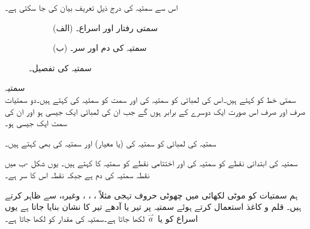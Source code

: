 اس سے سمتیہ کی درج ذیل تعریف بیان کی جا سکتی ہے۔
\begin{figure}
\centering
\begin{subfigure}{0.5\textwidth}
\centering
{}
\caption*{(الف) سمتی رفتار اور اسراع۔}
\end{subfigure}%
\begin{subfigure}{0.5\textwidth}
\centering
{}
\caption*{(ب) سمتیہ کی دم اور  سر۔}
\end{subfigure}%
\caption{سمتیہ کی تفصیل۔}
\label{شکل_الجبرا_قوت_سمتی_رفتار}
\end{figure}
\quad سمتیہ\\
سمتی خط کو  کہتے ہیں۔اس کی لمبائی کو سمتیہ کی  اور سمت کو سمتیہ کی  کہتے ہیں۔دو سمتیات صرف اور صرف اس صورت ایک دوسرے کے برابر ہوں گے جب ان کی لمبائی ایک جیسی ہو اور ان کی سمت ایک جیسی ہو۔

سمتیہ کی لمبائی کو سمتیہ کی  (یا معیار) اور سمتیہ کی  بھی کہتے ہیں۔

سمتیہ کی ابتدائی نقطے کو سمتیہ کی  اور اختتامی نقطے کو سمتیہ کا  کہتے ہیں۔ یوں شکل -ب میں نقطہ  سمتیہ  کی دم  ہے جبکہ نقطہ  اس کا سر  ہے۔

ہم سمتیات کو موٹی لکھائی میں چھوٹی حروف تہجی مثلاً ، ، ، وغیرہ،  سے ظاہر کرتے ہیں۔ قلم و کاغذ استعمال کرتے ہوئے سمتیہ پر تیر  یا آدھے تیر کا نشان بنایا جاتا ہے یوں اسراع کو  یا  
$\overset{\rightharpoonup}{\rule{0pt}{.9ex}\smash{a}}$
لکھا جاتا ہے۔سمتیہ  کی مقدار کو  لکھا جاتا ہے۔


